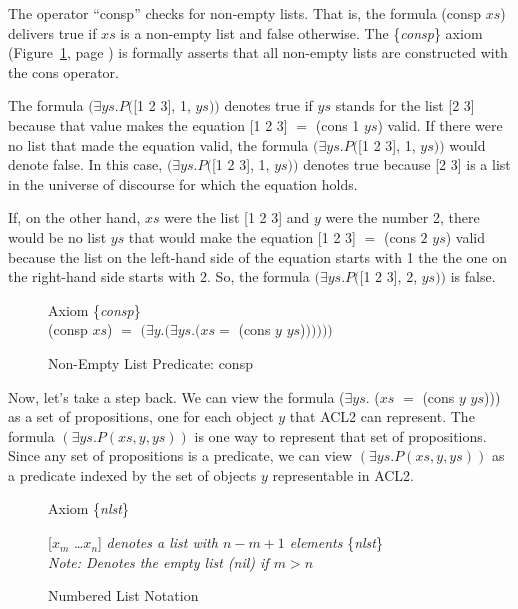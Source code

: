 The operator 
``consp''
checks for non-empty lists.
That is, the formula (consp $xs$) delivers true
if $xs$ is a non-empty list and false otherwise.
The \{\emph{consp}\} axiom
(Figure~\ref{consp-axiom}, page \pageref{consp-axiom})
is formally asserts that all non-empty lists
are constructed with the cons operator.

The formula
$(\exists ys.P($[1 2 3], 1, $ys))$ denotes true
if $ys$ stands for the list [2 3] because that value makes
the equation [1 2 3] $=$ (cons 1 $ys$) valid.
If there were no list that made the equation valid,
the formula $(\exists ys.P($[1 2 3], 1, $ys))$
would denote false.
In this case, $(\exists ys.P($[1 2 3], 1, $ys))$ denotes true
because [2 3] is a list in the universe of discourse
for which the equation holds.

If, on the other hand, $xs$ were the list [1 2 3]
and $y$ were the number 2, there would be no list
$ys$ that would make the equation [1 2 3] $=$ (cons $2$ $ys$) valid
because the list on the left-hand side of the equation
starts with 1 the the one on the right-hand side starts with 2.
So, the formula $(\exists ys.P($[1 2 3], 2, $ys))$
is false.

\begin{figure}
\begin{center}
Axiom \{\emph{consp}\} \\
(consp $xs$) $=$  $(\exists y.(\exists ys.(xs =$ (cons $y$ $ys$)$)))))$
\end{center}
\caption{Non-Empty List Predicate: consp}
\label{consp-axiom}
\end{figure}

Now, let's take a step back.
We can view the formula
($\exists ys.$ ($xs$ $=$ (cons $y$ $ys$)))
as a set of propositions,
one for each object $y$ that ACL2 can represent.
The formula
$(\exists ys.P(xs, y, ys))$ is one way to represent that
set of propositions.
Since any set of propositions is a predicate,
we can view $(\exists ys.P(xs, y, ys))$ as a predicate indexed
by the set of objects $y$ representable in ACL2.

\begin{figure}
\begin{center}
Axiom \{\emph{nlst}\}

[$x_{m}$ \dots $x_{n}$]  \emph{denotes a list with $n - m + 1$ elements} \{\emph{nlst}\} \\
\emph{Note: Denotes the empty list (nil) if $m > n$}
\end{center}
\caption{Numbered List Notation}
\label{numbered-list-interpretation}
\end{figure}

